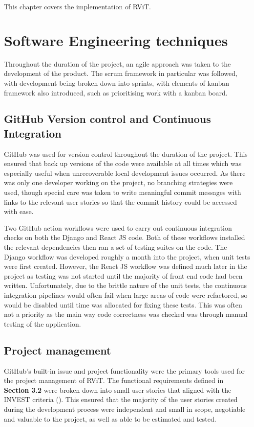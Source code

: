 \documentclass[l4proj.tex]{subfiles}
\begin{document}
    

This chapter covers the implementation of RViT. 

\section{Software Engineering techniques}
Throughout the duration of the project, an agile approach was taken to the development of the product. The scrum framework in particular was followed, with development being broken down into sprints, with elements of kanban framework also introduced, such as prioritising work with a kanban board.


\subsection{GitHub Version control and Continuous Integration}
GitHub was used for version control throughout the duration of the project. This ensured that back up versions of the code were available at all times which was especially useful when unrecoverable local development issues occurred. As there was only one developer working on the project, no branching strategies were used, though special care was taken to write meaningful commit messages with links to the relevant user stories so that the commit history could be accessed with ease. 

Two GitHub action workflows were used to carry out continuous integration checks on both the Django and React JS code. Both of these workflows installed the relevant dependencies then ran a set of testing suites on the code. The Django workflow was developed roughly a month into the project, when unit tests were first created. However, the React JS workflow was defined much later in the project as testing was not started until the majority of front end code had been written. Unfortunately, due to the brittle nature of the unit tests, the continuous integration pipelines would often fail when large areas of code were refactored, so would be disabled until time was allocated for fixing these tests. This was often not a priority as the main way code correctness was checked was through manual testing of the application.

\subsection{Project management}
GitHub's built-in issue and project functionality were the primary tools used for the project management of RViT. The functional requirements defined in \textbf{Section 3.2} were broken down into small user stories that aligned with the INVEST criteria (\cite{Buglione2013}). This ensured that the majority of the user stories created during the development process were independent and small in scope, negotiable and valuable to the project, as well as able to be estimated and tested. 
\end{document}
